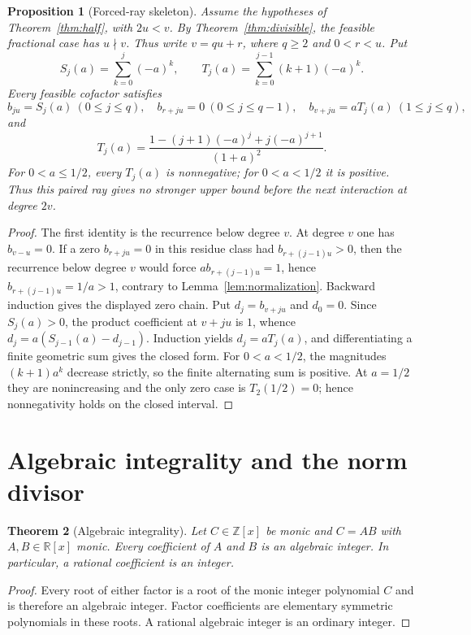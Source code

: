\documentclass[11pt]{article}
\newtheorem{theorem}{Theorem}[section]
\newtheorem{proposition}[theorem]{Proposition}
\theoremstyle{remark}
\newcommand{\Z}{\mathbb Z}
\numberwithin{equation}{section}
\begin{document}
\begin{proposition}[Forced-ray skeleton]\label{prop:skeleton}
Assume the hypotheses of Theorem~\ref{thm:half}, with $2u<v$.  By
Theorem~\ref{thm:divisible}, the feasible fractional case has $u\nmid v$.
Thus write $v=qu+r$, where $q\ge2$ and $0<r<u$.  Put
\[
 S_j(a)=\sum_{k=0}^j(-a)^k,\qquad
 T_j(a)=\sum_{k=0}^{j-1}(k+1)(-a)^k.
\]
Every feasible cofactor satisfies
\[
 b_{ju}=S_j(a)\ (0\le j\le q),\quad
 b_{r+ju}=0\ (0\le j\le q-1),\quad
 b_{v+ju}=aT_j(a)\ (1\le j\le q),
\]
and
\[
 T_j(a)=\frac{1-(j+1)(-a)^j+j(-a)^{j+1}}{(1+a)^2}.
\]
For $0<a\le1/2$, every $T_j(a)$ is nonnegative; for $0<a<1/2$ it is
positive.  Thus this paired ray gives no stronger upper bound before the next
interaction at degree $2v$.
\end{proposition}
\begin{proof}
The first identity is the recurrence below degree $v$.  At degree $v$ one has
$b_{v-u}=0$.  If a zero $b_{r+ju}=0$ in this residue class had
$b_{r+(j-1)u}>0$, then the recurrence below degree $v$ would force
$a b_{r+(j-1)u}=1$, hence $b_{r+(j-1)u}=1/a>1$, contrary to
Lemma~\ref{lem:normalization}.  Backward induction gives the displayed zero
chain.  Put $d_j=b_{v+ju}$ and $d_0=0$.  Since $S_j(a)>0$,
the product coefficient at $v+ju$ is $1$, whence
$d_j=a(S_{j-1}(a)-d_{j-1})$.  Induction yields $d_j=aT_j(a)$, and
differentiating a finite geometric sum gives the closed form.  For
$0<a<1/2$, the magnitudes $(k+1)a^k$ decrease strictly, so the finite
alternating sum is positive.  At $a=1/2$ they are nonincreasing and the only
zero case is $T_2(1/2)=0$; hence nonnegativity holds on the closed interval.
\end{proof}

\section{Algebraic integrality and the norm divisor}

\begin{theorem}[Algebraic integrality]\label{thm:integral}
Let $C\in\Z[x]$ be monic and $C=AB$ with $A,B\in\mathbb R[x]$ monic.  Every
coefficient of $A$ and $B$ is an algebraic integer.  In particular, a rational
coefficient is an integer.
\end{theorem}
\begin{proof}
Every root of either factor is a root of the monic integer polynomial $C$ and
is therefore an algebraic integer.  Factor coefficients are elementary
symmetric polynomials in these roots.  A rational algebraic integer is an
ordinary integer.
\end{proof}
\end{document}
